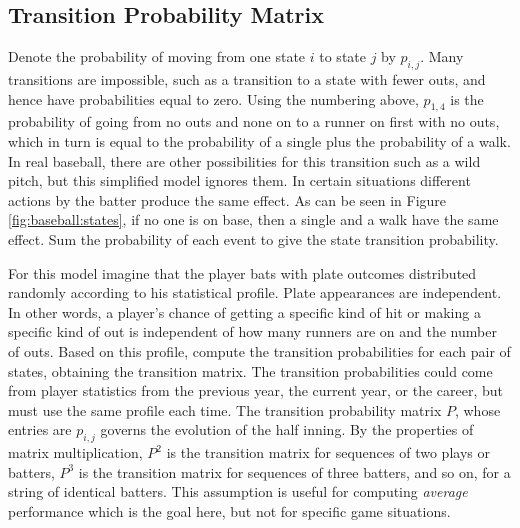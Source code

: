 \documentclass[12pt]{article}
\begin{document}
\subsection*{Transition Probability Matrix} Denote the probability of
moving from one state \( i \) to state \( j \) by \( p_{i,j} \).  Many
transitions are impossible, such as a transition to a state with fewer
outs, and hence have probabilities equal to zero. Using the numbering
above, \( p_{1,4} \) is the probability of going from no outs and none
on to a runner on first with no outs, which in turn is equal to the
probability of a single plus the probability of a walk.  In real
baseball, there are other possibilities for this transition such as a
wild pitch, but this simplified model ignores them. In certain
situations different actions by the batter produce the same effect.  As
can be seen in Figure~%
\ref{fig:baseball:states}, if no one is on base, then a single and a
walk have the same effect.  Sum the probability of each event to give
the state transition probability.

For this model imagine that the player bats with plate outcomes
distributed randomly according to his statistical profile.  Plate
appearances are independent.  In other words, a player's chance of
getting a specific kind of hit or making a specific kind of out is
independent of how many runners are on and the number of outs.  Based on
this profile, compute the transition probabilities for each pair of
states, obtaining the transition matrix.  The transition probabilities
could come from player statistics from the previous year, the current
year, or the career, but must use the same profile each time.  The
transition probability matrix \( P \), whose entries are \( p_{i,j} \)
governs the evolution of the half inning.  By the properties of matrix
multiplication, \( P^2 \) is the transition matrix for sequences of two
plays or batters, \( P^3 \) is the transition matrix for sequences of
three batters, and so on, for a string of identical batters.  This
assumption is useful for computing \emph{average} performance which is
the goal here, but not for specific game situations.
\end{document}
